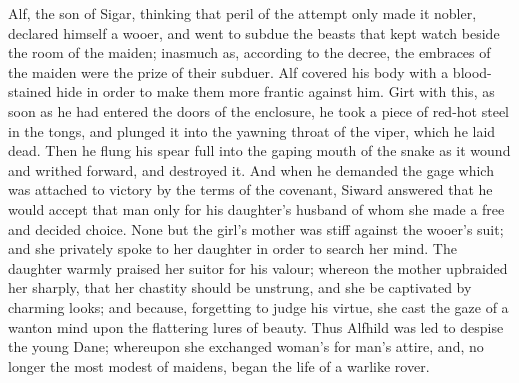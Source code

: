 \documentclass[10pt,a4paper]{report}
\begin{document}
Alf, the son of Sigar, thinking that peril of the attempt only made it nobler, declared himself a wooer, and went to subdue the beasts that kept watch beside the room of the maiden; inasmuch as, according to the decree, the embraces of the maiden were the prize of their subduer. Alf covered his body with a blood-stained hide in order to make them more frantic against him. Girt with this, as soon as he had entered the doors of the enclosure, he took a piece of red-hot steel in the tongs, and plunged it into the yawning throat of the viper, which he laid dead. Then he flung his spear full into the gaping mouth of the snake as it wound and writhed forward, and destroyed it. And when he demanded the gage which was attached to victory by the terms of the covenant, Siward answered that he would accept that man only for his daughter's husband of whom she made a free and decided choice. None but the girl's mother was stiff against the wooer's suit; and she privately spoke to her daughter in order to search her mind. The daughter warmly praised her suitor for his valour; whereon the mother upbraided her sharply, that her chastity should be unstrung, and she be captivated by charming looks; and because, forgetting to judge his virtue, she cast the gaze of a wanton mind upon the flattering lures of beauty. Thus Alfhild was led to despise the young Dane; whereupon she exchanged woman's for man's attire, and, no longer the most modest of maidens, began the life of a warlike rover.\\
\end{document}
